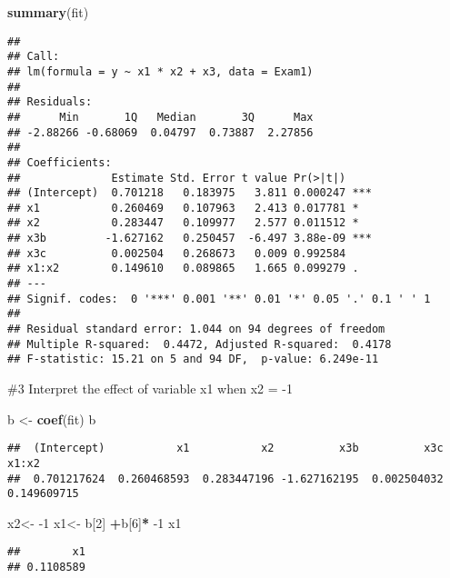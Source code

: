 \documentclass[
]{article}
\newenvironment{Shaded}{\begin{snugshade}}{\end{snugshade}}
\newcommand{\DecValTok}[1]{\textcolor[rgb]{0.00,0.00,0.81}{#1}}
\newcommand{\KeywordTok}[1]{\textcolor[rgb]{0.13,0.29,0.53}{\textbf{#1}}}
\newcommand{\NormalTok}[1]{#1}
\newcommand{\OperatorTok}[1]{\textcolor[rgb]{0.81,0.36,0.00}{\textbf{#1}}}
\newcommand{\StringTok}[1]{\textcolor[rgb]{0.31,0.60,0.02}{#1}}
\begin{document}
\begin{Shaded}
\begin{Highlighting}[]
\KeywordTok{summary}\NormalTok{(fit)}
\end{Highlighting}
\end{Shaded}

\begin{verbatim}
## 
## Call:
## lm(formula = y ~ x1 * x2 + x3, data = Exam1)
## 
## Residuals:
##      Min       1Q   Median       3Q      Max 
## -2.88266 -0.68069  0.04797  0.73887  2.27856 
## 
## Coefficients:
##              Estimate Std. Error t value Pr(>|t|)    
## (Intercept)  0.701218   0.183975   3.811 0.000247 ***
## x1           0.260469   0.107963   2.413 0.017781 *  
## x2           0.283447   0.109977   2.577 0.011512 *  
## x3b         -1.627162   0.250457  -6.497 3.88e-09 ***
## x3c          0.002504   0.268673   0.009 0.992584    
## x1:x2        0.149610   0.089865   1.665 0.099279 .  
## ---
## Signif. codes:  0 '***' 0.001 '**' 0.01 '*' 0.05 '.' 0.1 ' ' 1
## 
## Residual standard error: 1.044 on 94 degrees of freedom
## Multiple R-squared:  0.4472, Adjusted R-squared:  0.4178 
## F-statistic: 15.21 on 5 and 94 DF,  p-value: 6.249e-11
\end{verbatim}

\#3 Interpret the effect of variable x1 when x2 = -1

\begin{Shaded}
\begin{Highlighting}[]
\NormalTok{b <-}\StringTok{ }\KeywordTok{coef}\NormalTok{(fit)}
\NormalTok{b}
\end{Highlighting}
\end{Shaded}

\begin{verbatim}
##  (Intercept)           x1           x2          x3b          x3c        x1:x2 
##  0.701217624  0.260468593  0.283447196 -1.627162195  0.002504032  0.149609715
\end{verbatim}

\begin{Shaded}
\begin{Highlighting}[]
\NormalTok{x2<-}\StringTok{ }\DecValTok{-1}
\NormalTok{x1<-}\StringTok{ }\NormalTok{b[}\DecValTok{2}\NormalTok{] }\OperatorTok{+}\NormalTok{b[}\DecValTok{6}\NormalTok{]}\OperatorTok{*}\StringTok{ }\DecValTok{-1}
\NormalTok{x1}
\end{Highlighting}
\end{Shaded}

\begin{verbatim}
##        x1 
## 0.1108589
\end{verbatim}
\end{document}

